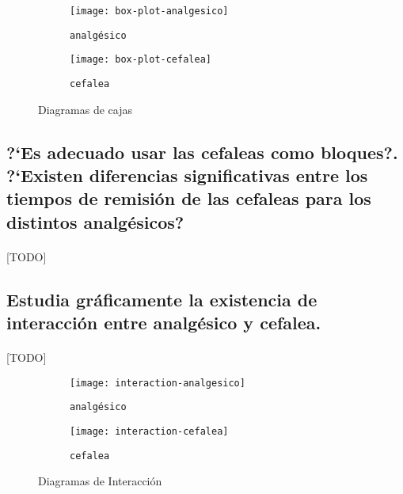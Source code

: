 \documentclass[11pt]{article}
\begin{document}
      \begin{figure}[H]
      \centering
      \begin{subfigure}{.5\textwidth}
        \centering
        \texttt{[image: box-plot-analgesico]}
        \caption{\texttt{analgésico}}
        \label{fig:sub1}
      \end{subfigure}%
      \begin{subfigure}{.5\textwidth}
        \centering
        \texttt{[image: box-plot-cefalea]}
        \caption{\texttt{cefalea}}
        \label{fig:sub2}
      \end{subfigure}
      \caption{Diagramas de cajas}
      \label{fig:test}
      \end{figure}


    \subsection{?`Es adecuado usar las cefaleas como bloques?. ?`Existen diferencias significativas entre los tiempos de remisión de las cefaleas para los distintos analgésicos?}

      \paragraph{}
      [TODO]

    \subsection{Estudia gráficamente la existencia de interacción entre analgésico y cefalea.}

      \paragraph{}
      [TODO]

      \begin{figure}[H]
      \centering
      \begin{subfigure}{.5\textwidth}
        \centering
        \texttt{[image: interaction-analgesico]}
        \caption{\texttt{analgésico}}
        \label{fig:sub1}
      \end{subfigure}%
      \begin{subfigure}{.5\textwidth}
        \centering
        \texttt{[image: interaction-cefalea]}
        \caption{\texttt{cefalea}}
        \label{fig:sub2}
      \end{subfigure}
      \caption{Diagramas de Interacción}
      \label{fig:test}
      \end{figure}
\end{document}
